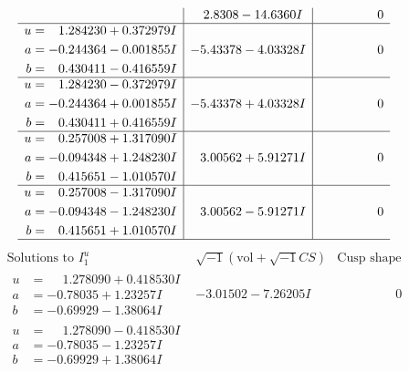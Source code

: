 \documentclass[1p]{elsarticle_modified}
\theoremstyle{definition}
\newcommand{\I}{\sqrt{-1}}
\begin{document}
$$\begin{array}{c|c|c}
 & \phantom{-}2.8308 - 14.6360 I & \phantom{-0.000000 } 0 \\ \hline\begin{aligned}
u &= \phantom{-}1.284230 + 0.372979 I \\
a &= -0.244364 - 0.001855 I \\
b &= \phantom{-}0.430411 - 0.416559 I\end{aligned}
 & -5.43378 - 4.03328 I & \phantom{-0.000000 } 0 \\ \hline\begin{aligned}
u &= \phantom{-}1.284230 - 0.372979 I \\
a &= -0.244364 + 0.001855 I \\
b &= \phantom{-}0.430411 + 0.416559 I\end{aligned}
 & -5.43378 + 4.03328 I & \phantom{-0.000000 } 0 \\ \hline\begin{aligned}
u &= \phantom{-}0.257008 + 1.317090 I \\
a &= -0.094348 + 1.248230 I \\
b &= \phantom{-}0.415651 - 1.010570 I\end{aligned}
 & \phantom{-}3.00562 + 5.91271 I & \phantom{-0.000000 } 0 \\ \hline\begin{aligned}
u &= \phantom{-}0.257008 - 1.317090 I \\
a &= -0.094348 - 1.248230 I \\
b &= \phantom{-}0.415651 + 1.010570 I\end{aligned}
 & \phantom{-}3.00562 - 5.91271 I & \phantom{-0.000000 } 0\\
 \hline 
 \end{array}$$\newpage$$\begin{array}{c|c|c}  
\text{Solutions to }I^u_{1}& \I (\text{vol} + \sqrt{-1}CS) & \text{Cusp shape}\\
 \hline 
\begin{aligned}
u &= \phantom{-}1.278090 + 0.418530 I \\
a &= -0.78035 + 1.23257 I \\
b &= -0.69929 - 1.38064 I\end{aligned}
 & -3.01502 - 7.26205 I & \phantom{-0.000000 } 0 \\ \hline\begin{aligned}
u &= \phantom{-}1.278090 - 0.418530 I \\
a &= -0.78035 - 1.23257 I \\
b &= -0.69929 + 1.38064 I\end{aligned}

\end{array}$$
\end{document}
